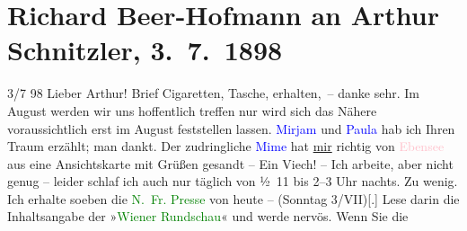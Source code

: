 

               \section[Richard Beer-Hofmann an Arthur Schnitzler, 3. 7. 1898]{ Richard Beer-Hofmann an Arthur Schnitzler, 3. 7. 1898}\nopagebreak{}\rehead{ }\normalsize\beginnumbering{} \toendnotes[C]{\smallbreak\pagebreak[2]} 
\toendnotes[C]{\smallbreak}\pstart
           \raggedleft{}{\pb}3/7 98\pend
           \pstart
           Lieber Arthur! Brief Cigaretten, Tasche, erhalten, – danke sehr.\pend
           \pstart
           Im August werden wir uns hoffentlich treffen nur wird sich das Nähere
               voraussichtlich erst im August feststellen lassen. \textcolor{blue}{Mirjam}{}\ledrightnote{\textcolor{blue}{Mirjam Beer-Hofmann}} und \textcolor{blue}{Paula}{}\ledrightnote{\textcolor{blue}{Paula Beer-Hofmann}} hab ich
               Ihren Traum erzählt; man {\pb}dankt.
               Der zudringliche \textcolor{blue}{Mime}{} hat \uline{mir} richtig von \textcolor{pink}{Ebensee}{}\ledrightnote{\textcolor{pink}{Ebensee}} aus eine Ansichtskarte mit Grüßen gesandt – Ein Viech! – Ich
               arbeite, aber nicht genug – leider schlaf ich auch nur täglich von ½ 11
               bis 2–3 Uhr nachts. Zu wenig. Ich erhalte {\pb}soeben die \textcolor{green}{N. Fr. Presse}{}\ledrightnote{\textcolor{green}{Neue Freie Presse}} von heute – (Sonntag
                  3/VII){[}.{]} Lese darin die Inhaltsangabe der »\textcolor{green}{Wiener Rundschau}{}\ledrightnote{\textcolor{green}{Wiener Rundschau}}« und werde nervös. Wenn Sie die
